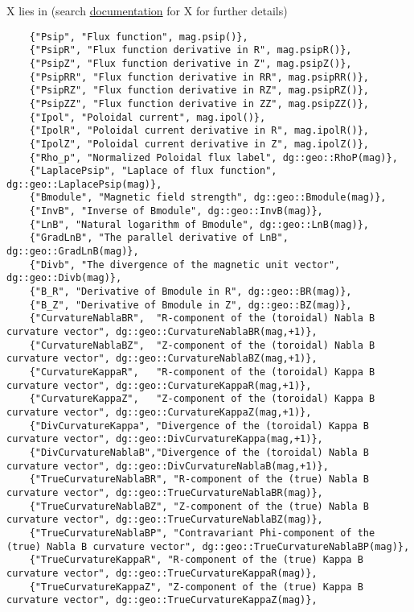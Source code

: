 X lies in (search
\href{https://mwiesenberger.github.io/feltor/geometries/html/modules.html}{documentation} for X for further details)
\begin{verbatim}
    {"Psip", "Flux function", mag.psip()},
    {"PsipR", "Flux function derivative in R", mag.psipR()},
    {"PsipZ", "Flux function derivative in Z", mag.psipZ()},
    {"PsipRR", "Flux function derivative in RR", mag.psipRR()},
    {"PsipRZ", "Flux function derivative in RZ", mag.psipRZ()},
    {"PsipZZ", "Flux function derivative in ZZ", mag.psipZZ()},
    {"Ipol", "Poloidal current", mag.ipol()},
    {"IpolR", "Poloidal current derivative in R", mag.ipolR()},
    {"IpolZ", "Poloidal current derivative in Z", mag.ipolZ()},
    {"Rho_p", "Normalized Poloidal flux label", dg::geo::RhoP(mag)},
    {"LaplacePsip", "Laplace of flux function", dg::geo::LaplacePsip(mag)},
    {"Bmodule", "Magnetic field strength", dg::geo::Bmodule(mag)},
    {"InvB", "Inverse of Bmodule", dg::geo::InvB(mag)},
    {"LnB", "Natural logarithm of Bmodule", dg::geo::LnB(mag)},
    {"GradLnB", "The parallel derivative of LnB", dg::geo::GradLnB(mag)},
    {"Divb", "The divergence of the magnetic unit vector", dg::geo::Divb(mag)},
    {"B_R", "Derivative of Bmodule in R", dg::geo::BR(mag)},
    {"B_Z", "Derivative of Bmodule in Z", dg::geo::BZ(mag)},
    {"CurvatureNablaBR",  "R-component of the (toroidal) Nabla B curvature vector", dg::geo::CurvatureNablaBR(mag,+1)},
    {"CurvatureNablaBZ",  "Z-component of the (toroidal) Nabla B curvature vector", dg::geo::CurvatureNablaBZ(mag,+1)},
    {"CurvatureKappaR",   "R-component of the (toroidal) Kappa B curvature vector", dg::geo::CurvatureKappaR(mag,+1)},
    {"CurvatureKappaZ",   "Z-component of the (toroidal) Kappa B curvature vector", dg::geo::CurvatureKappaZ(mag,+1)},
    {"DivCurvatureKappa", "Divergence of the (toroidal) Kappa B curvature vector", dg::geo::DivCurvatureKappa(mag,+1)},
    {"DivCurvatureNablaB","Divergence of the (toroidal) Nabla B curvature vector", dg::geo::DivCurvatureNablaB(mag,+1)},
    {"TrueCurvatureNablaBR", "R-component of the (true) Nabla B curvature vector", dg::geo::TrueCurvatureNablaBR(mag)},
    {"TrueCurvatureNablaBZ", "Z-component of the (true) Nabla B curvature vector", dg::geo::TrueCurvatureNablaBZ(mag)},
    {"TrueCurvatureNablaBP", "Contravariant Phi-component of the (true) Nabla B curvature vector", dg::geo::TrueCurvatureNablaBP(mag)},
    {"TrueCurvatureKappaR", "R-component of the (true) Kappa B curvature vector", dg::geo::TrueCurvatureKappaR(mag)},
    {"TrueCurvatureKappaZ", "Z-component of the (true) Kappa B curvature vector", dg::geo::TrueCurvatureKappaZ(mag)},

\end{verbatim}
